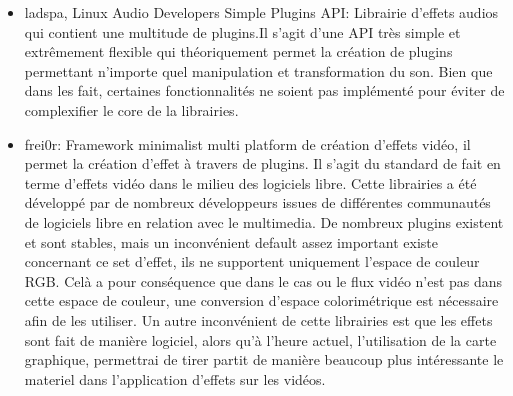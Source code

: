 \begin{itemize}

  \item {ladspa, Linux Audio Developers Simple Plugins API: Librairie
  d'effets audios qui contient une multitude de plugins.Il s'agit d'une
  API très simple et extrêmement flexible qui théoriquement permet
  la création de plugins permettant n'importe quel manipulation
  et transformation du son. Bien que dans les fait, certaines
  fonctionnalités ne soient pas implémenté pour éviter de complexifier
  le core de la librairies.}

  \item {frei0r: Framework minimalist multi platform de création
    d'effets vidéo, il permet la création d'effet à travers de
    plugins. Il s'agit du standard de fait en terme d'effets vidéo
    dans le milieu des logiciels libre. Cette librairies a été
    développé par de nombreux développeurs issues de différentes
    communautés de logiciels libre en relation avec le multimedia. De
    nombreux plugins existent et sont stables, mais un inconvénient
    default assez important existe concernant ce set d'effet, ils
    ne supportent uniquement l'espace de couleur RGB. Celà a pour
    conséquence que dans le cas ou le flux vidéo n'est pas dans
    cette espace de couleur, une conversion d'espace
    colorimétrique est nécessaire afin de les utiliser. Un autre
    inconvénient de cette librairies est que les effets sont fait de
    manière logiciel, alors qu'à l'heure actuel, l'utilisation de la
    carte graphique, permettrai de tirer partit de manière beaucoup
    plus intéressante le materiel dans l'application d'effets sur
    les vidéos.}


\end{itemize}

\paragraph{}

